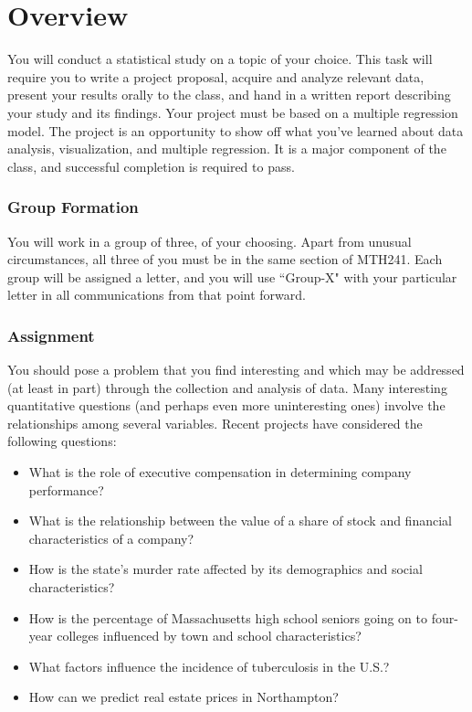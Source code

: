 \documentclass[10pt]{article}
\begin{document}

\section{Overview} 
You will conduct a statistical study on a topic of your choice. This task will require you to write a project proposal, acquire and analyze relevant data, present your results orally to the class, and hand in a written report describing your study and its findings. Your project must be based on a multiple regression model. The project is an opportunity to show off what you've learned about data analysis, visualization, and multiple regression. It is a major component of the class, and successful completion is required to pass. 

\subsubsection*{Group Formation}
You will work in a group of three, of your choosing. Apart from unusual circumstances, all three of you must be in the same section of MTH241. Each group will be assigned a letter, and you will use ``Group-X" with your particular letter in all communications from that point forward.  

\subsubsection*{Assignment}
You should pose a problem that you find interesting and which may be addressed (at least in part) through the collection and analysis of data. Many interesting quantitative questions (and perhaps even more uninteresting ones) involve the relationships among several variables. Recent projects have considered the following questions:

\begin{itemize}
	\item What is the role of executive compensation in determining company performance?
	\item What is the relationship between the value of a share of stock and financial characteristics of a company?
	\item How is the state's murder rate affected by its demographics and social characteristics?
	\item How is the percentage of Massachusetts high school seniors going on to four-year colleges influenced by town and school characteristics?
	\item What factors influence the incidence of tuberculosis in the U.S.?
	\item How can we predict real estate prices in Northampton?
\end{itemize}
\end{document}
